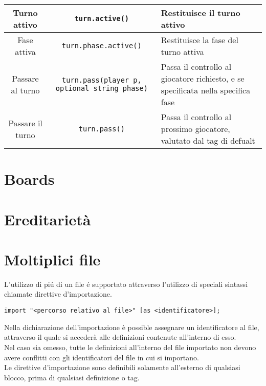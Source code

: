 \begin{tabular}{|c|c|p{5cm}|}
   \hline 
   Turno attivo & \lstinline|turn.active()| & Restituisce il turno attivo \\
   \hline
   Fase attiva & \lstinline|turn.phase.active()| & Restituisce la fase del turno attiva \\
   \hline
   Passare al turno & \lstinline|turn.pass(player p, optional string phase)| & 
   Passa il controllo al giocatore richiesto, 
   e se specificata nella specifica fase \\
   \hline
   Passare il turno & \lstinline|turn.pass()| & Passa il controllo al prossimo giocatore, valutato dal tag di defualt \\
   \hline 
\end{tabular}

\section{Boards}

\section{Ereditarietà}

\section{Moltiplici file} \label{MultipleFiles}
L'utilizzo di piú di un file é supportato attraverso l'utilizzo di speciali sintassi
chiamate direttive d'importazione. 
\begin{lstlisting}
import "<percorso relativo al file>" [as <identificatore>];
\end{lstlisting}
Nella dichiarazione dell'importazione è possible assegnare un identificatore al file, 
attraverso il quale si accederà alle definizioni contenute all'interno di esso. \\
Nel caso sia omesso, tutte le definizioni all'interno del file importato non devono avere
conflitti con gli identificatori del file in cui si importano. \\
Le direttive d'importazione sono definibili solamente all'esterno di qualsiasi blocco,
prima di qualsiasi definizione o tag. 







